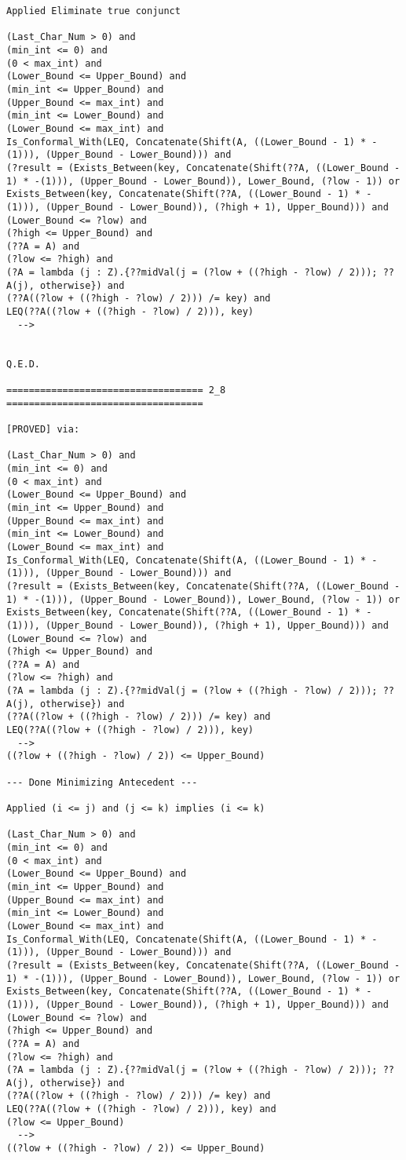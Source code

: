 \begin{lstlisting}[language=resolve]
Applied Eliminate true conjunct

(Last_Char_Num > 0) and
(min_int <= 0) and
(0 < max_int) and
(Lower_Bound <= Upper_Bound) and
(min_int <= Upper_Bound) and
(Upper_Bound <= max_int) and
(min_int <= Lower_Bound) and
(Lower_Bound <= max_int) and
Is_Conformal_With(LEQ, Concatenate(Shift(A, ((Lower_Bound - 1) * -(1))), (Upper_Bound - Lower_Bound))) and
(?result = (Exists_Between(key, Concatenate(Shift(??A, ((Lower_Bound - 1) * -(1))), (Upper_Bound - Lower_Bound)), Lower_Bound, (?low - 1)) or Exists_Between(key, Concatenate(Shift(??A, ((Lower_Bound - 1) * -(1))), (Upper_Bound - Lower_Bound)), (?high + 1), Upper_Bound))) and
(Lower_Bound <= ?low) and
(?high <= Upper_Bound) and
(??A = A) and
(?low <= ?high) and
(?A = lambda (j : Z).{??midVal(j = (?low + ((?high - ?low) / 2))); ??A(j), otherwise}) and
(??A((?low + ((?high - ?low) / 2))) /= key) and
LEQ(??A((?low + ((?high - ?low) / 2))), key)
  -->


Q.E.D.

=================================== 2_8 ===================================

[PROVED] via:

(Last_Char_Num > 0) and
(min_int <= 0) and
(0 < max_int) and
(Lower_Bound <= Upper_Bound) and
(min_int <= Upper_Bound) and
(Upper_Bound <= max_int) and
(min_int <= Lower_Bound) and
(Lower_Bound <= max_int) and
Is_Conformal_With(LEQ, Concatenate(Shift(A, ((Lower_Bound - 1) * -(1))), (Upper_Bound - Lower_Bound))) and
(?result = (Exists_Between(key, Concatenate(Shift(??A, ((Lower_Bound - 1) * -(1))), (Upper_Bound - Lower_Bound)), Lower_Bound, (?low - 1)) or Exists_Between(key, Concatenate(Shift(??A, ((Lower_Bound - 1) * -(1))), (Upper_Bound - Lower_Bound)), (?high + 1), Upper_Bound))) and
(Lower_Bound <= ?low) and
(?high <= Upper_Bound) and
(??A = A) and
(?low <= ?high) and
(?A = lambda (j : Z).{??midVal(j = (?low + ((?high - ?low) / 2))); ??A(j), otherwise}) and
(??A((?low + ((?high - ?low) / 2))) /= key) and
LEQ(??A((?low + ((?high - ?low) / 2))), key)
  -->
((?low + ((?high - ?low) / 2)) <= Upper_Bound)

--- Done Minimizing Antecedent ---

Applied (i <= j) and (j <= k) implies (i <= k)

(Last_Char_Num > 0) and
(min_int <= 0) and
(0 < max_int) and
(Lower_Bound <= Upper_Bound) and
(min_int <= Upper_Bound) and
(Upper_Bound <= max_int) and
(min_int <= Lower_Bound) and
(Lower_Bound <= max_int) and
Is_Conformal_With(LEQ, Concatenate(Shift(A, ((Lower_Bound - 1) * -(1))), (Upper_Bound - Lower_Bound))) and
(?result = (Exists_Between(key, Concatenate(Shift(??A, ((Lower_Bound - 1) * -(1))), (Upper_Bound - Lower_Bound)), Lower_Bound, (?low - 1)) or Exists_Between(key, Concatenate(Shift(??A, ((Lower_Bound - 1) * -(1))), (Upper_Bound - Lower_Bound)), (?high + 1), Upper_Bound))) and
(Lower_Bound <= ?low) and
(?high <= Upper_Bound) and
(??A = A) and
(?low <= ?high) and
(?A = lambda (j : Z).{??midVal(j = (?low + ((?high - ?low) / 2))); ??A(j), otherwise}) and
(??A((?low + ((?high - ?low) / 2))) /= key) and
LEQ(??A((?low + ((?high - ?low) / 2))), key) and
(?low <= Upper_Bound)
  -->
((?low + ((?high - ?low) / 2)) <= Upper_Bound)


\end{lstlisting}

